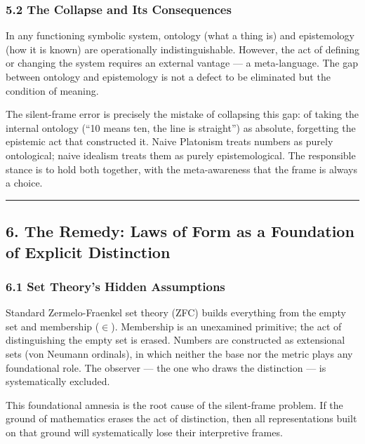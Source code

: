 \documentclass[
]{article}
\begin{document}
\subsubsection{5.2 The Collapse and Its
Consequences}\label{the-collapse-and-its-consequences}

In any functioning symbolic system, ontology (what a thing is) and
epistemology (how it is known) are operationally indistinguishable.
However, the act of defining or changing the system requires an external
vantage --- a meta-language. The gap between ontology and epistemology
is not a defect to be eliminated but the condition of meaning.

The silent-frame error is precisely the mistake of collapsing this gap:
of taking the internal ontology (``10 means ten, the line is straight'')
as absolute, forgetting the epistemic act that constructed it. Naive
Platonism treats numbers as purely ontological; naive idealism treats
them as purely epistemological. The responsible stance is to hold both
together, with the meta-awareness that the frame is always a choice.

\begin{center}\rule{0.5\linewidth}{0.5pt}\end{center}

\subsection{6. The Remedy: Laws of Form as a Foundation of Explicit
Distinction}\label{the-remedy-laws-of-form-as-a-foundation-of-explicit-distinction}

\subsubsection{6.1 Set Theory's Hidden
Assumptions}\label{set-theorys-hidden-assumptions}

Standard Zermelo-Fraenkel set theory (ZFC) builds everything from the
empty set and membership (\(\in\)). Membership is an unexamined
primitive; the act of distinguishing the empty set is erased. Numbers
are constructed as extensional sets (von Neumann ordinals), in which
neither the base nor the metric plays any foundational role. The
observer --- the one who draws the distinction --- is systematically
excluded.

This foundational amnesia is the root cause of the silent-frame problem.
If the ground of mathematics erases the act of distinction, then all
representations built on that ground will systematically lose their
interpretive frames.
\end{document}
